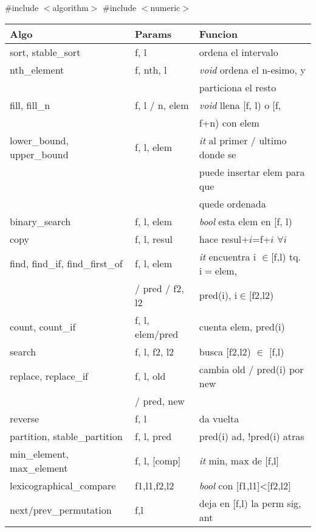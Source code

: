\#include $<$algorithm$>$ \#include $<$numeric$>$ \\
\begin{tabular}{|l|l|p{5.4cm}|} \hline
\textbf{Algo} & \textbf{Params} &  \textbf{Funcion} \\  \hline
sort, stable\_sort & f, l &  ordena el intervalo \\  \hline
nth\_element & f, nth, l & \textit{void} ordena el n-esimo, y \\ && particiona el resto \\  \hline
fill, fill\_n & f, l / n, elem & \textit{void} llena [f, l) o [f, \\ && f+n) con elem \\  \hline
lower\_bound, upper\_bound & f, l, elem & \textit{it} al primer / ultimo donde se \\ && puede insertar elem para que\\ && quede ordenada \\  \hline
binary\_search & f, l, elem & \textit{bool} esta elem en [f, l) \\  \hline
copy & f, l, resul & hace resul+$i$=f+$i$ $\forall i$ \\  \hline
find, find\_if, find\_first\_of & f, l, elem & \textit{it} encuentra i $\in$[f,l) tq. i$=$elem, \\ & / pred / f2, l2 & pred(i), i$\in$[f2,l2)\\\hline
count, count\_if & f, l, elem/pred & cuenta elem, pred(i)\\\hline
search & f, l, f2, l2 & busca [f2,l2) $\in$ [f,l)\\\hline
replace, replace\_if & f, l, old & cambia old / pred(i) por new \\ & / pred, new &\\\hline
reverse & f, l & da vuelta\\\hline
partition, stable\_partition & f, l, pred & pred(i) ad, !pred(i) atras\\\hline
min\_element, max\_element & f, l, [comp] & \textit{it} min, max de [f,l]\\\hline
lexicographical\_compare & f1,l1,f2,l2 & \textit{bool} con [f1,l1]<[f2,l2]\\\hline
next/prev\_permutation & f,l & deja en [f,l) la perm sig, ant\\\hline

\end{tabular}
